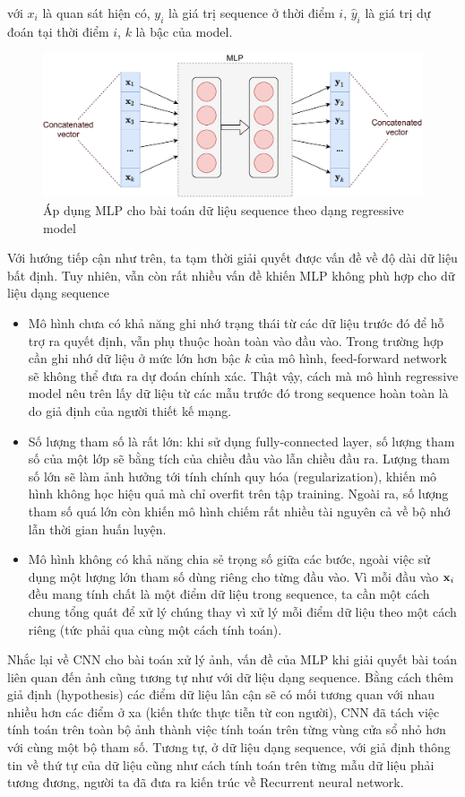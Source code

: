 với $x_i$ là quan sát hiện có, $y_i$ là giá trị sequence ở thời điểm $i$, $\hat{y}_i$ là giá trị dự đoán tại thời điểm $i$, $k$ là bậc của model.
\begin{figure}[h!]
    \centering
    \includegraphics[width=\textwidth,height=\textheight,keepaspectratio]{chapter06/figure-sec1/mlp.pdf}
    \caption{Áp dụng MLP cho bài toán dữ liệu sequence theo dạng regressive model}
\end{figure}

Với hướng tiếp cận như trên, ta tạm thời giải quyết được vấn đề về độ dài dữ liệu bất định. Tuy nhiên, vẫn còn rất nhiều vấn đề khiến MLP không phù hợp cho dữ liệu dạng sequence
\begin{itemize}
    \item Mô hình chưa có khả năng ghi nhớ trạng thái từ các dữ liệu trước đó để hỗ trợ ra quyết định, vẫn phụ thuộc hoàn toàn vào đầu vào. Trong trường hợp cần ghi nhớ dữ liệu ở mức lớn hơn bậc $k$ của mô hình, feed-forward network sẽ không thể đưa ra dự đoán chính xác. Thật vậy, cách mà mô hình regressive model nêu trên lấy dữ liệu từ các mẫu trước đó trong sequence hoàn toàn là do giả định của người thiết kế mạng.
    \item Số lượng tham số là rất lớn: khi sử dụng fully-connected layer, số lượng tham số của một lớp sẽ bằng tích của chiều đầu vào lẫn chiều đầu ra. Lượng tham số lớn sẽ làm ảnh hưởng tới tính chính quy hóa (regularization), khiến mô hình không học hiệu quả mà chỉ overfit trên tập training. Ngoài ra, số lượng tham số quá lớn còn khiến mô hình chiếm rất nhiều tài nguyên cả về bộ nhớ lẫn thời gian huấn luyện.
    \item Mô hình không có khả năng chia sẻ trọng số giữa các bước, ngoài việc sử dụng một lượng lớn tham số dùng riêng cho từng đầu vào. Vì mỗi đầu vào $\textbf x_i$ đều mang tính chất là một điểm dữ liệu trong sequence, ta cần một cách chung tổng quát để xử lý chúng thay vì xử lý mỗi điểm dữ liệu theo một cách riêng (tức phải qua cùng một cách tính toán).
\end{itemize}

Nhắc lại về CNN cho bài toán xử lý ảnh, vấn đề của MLP khi giải quyết bài toán liên quan đến ảnh cũng tương tự như với dữ liệu dạng sequence. Bằng cách thêm giả định (hypothesis) các điểm dữ liệu lân cận sẽ có mối tương quan với nhau nhiều hơn các điểm ở xa (kiến thức thực tiễn từ con người), CNN đã tách việc tính toán trên toàn bộ ảnh thành việc tính toán trên từng vùng cửa sổ nhỏ hơn với cùng một bộ tham số. Tương tự, ở dữ liệu dạng sequence, với giả định thông tin về thứ tự của dữ liệu cũng như cách tính toán trên từng mẫu dữ liệu phải tương đương, người ta đã đưa ra kiến trúc về Recurrent neural network.
